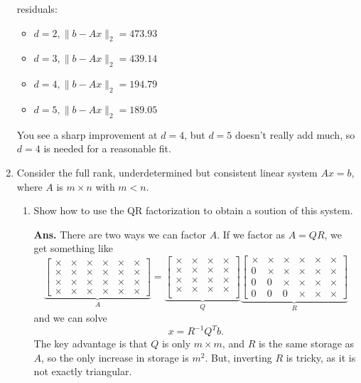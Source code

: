 \documentclass{article}
\newcommand{\showsolution}[1]{\textbf{Ans.}\;#1}
\newcommand{\bmat}{\left[\begin{matrix}}
\newcommand{\emat}{\end{matrix}\right]}
\begin{document}
\begin{enumerate}
{\begin{center}
	\end{center}
	residuals:
	\begin{itemize}
		\item $d=2,\|b-Ax\|_2 = 473.93$
		\item $d=3,\|b-Ax\|_2 = 439.14$
		\item $d=4,\|b-Ax\|_2 = 194.79$
		\item $d=5,\|b-Ax\|_2 = 189.05$
	\end{itemize}
You see a sharp improvement at $d = 4$, but $d = 5$ doesn't really add much, so $d=4$ is needed for a reasonable fit.
}

\item Consider the full rank, underdetermined but consistent linear system $Ax = b$, where $A$ is $m\times n$ with $m < n$. 
 \begin{enumerate}
	\item Show how to use the QR factorization to obtain a soution of this system.
	
 	\showsolution{
There are two ways we can factor $A$. If we factor as $A = QR$, we get something like
\[
\underbrace{\bmat 
\times  & \times & \times & \times & \times& \times \\
\times  & \times & \times & \times & \times & \times\\
\times  & \times & \times & \times & \times & \times\\
\times  & \times & \times & \times & \times & \times
\emat 
}_{A}
=
\underbrace{\bmat 
\times  & \times & \times & \times  \\
\times  & \times & \times & \times  \\
\times  & \times & \times & \times  \\
\times  & \times & \times & \times  \\
\emat }_{Q}
\underbrace{\bmat 
\times  & \times 	& \times & \times & \times & \times\\
0  		& \times 	& \times & \times & \times & \times\\
0  		& 0		 	& \times & \times & \times& \times \\
0  		& 0		 	& 0 & \times & \times & \times
\emat }_{R}
\]
and we can solve 
\[
x = R^{-1}Q^Tb.
\]
The key advantage is that $Q$ is only $m\times m$, and $R$ is the same storage as $A$, so the only increase in storage is $m^2$. But, inverting $R$ is tricky, as it is not exactly triangular.

}
\end{enumerate}
\end{enumerate}
\end{document}
